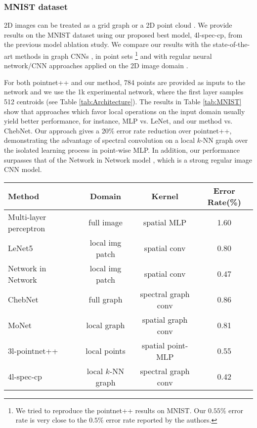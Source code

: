 \documentclass[runningheads]{llncs}
\begin{document}
\subsubsection{MNIST dataset}\label{sec:exp_mnist}
2D images can be treated as a grid graph \cite{defferrard2016convolutional,monti2016geometric} or a 2D point cloud \cite{qi2017pointnet}. We provide results on the MNIST dataset using our proposed best model, 4l-spec-cp, from the previous model ablation study. We compare our results with the state-of-the-art methods in graph CNNs \cite{defferrard2016convolutional,monti2016geometric}, in point sets \cite{qi2017pointnet} \footnote{We tried to reproduce the pointnet++ results on MNIST. Our $0.55 \%$ error rate is very close to the $0.5 \%$ error rate reported by the authors.} and with regular neural network/CNN approaches applied on the 2D image domain \cite{simard2003best,lecun1998gradient,lin2013network}.

For both pointnet++ and our method, 784 points are provided as inputs to the network and we use the 1k experimental network, where the first layer samples 512 centroids (see Table \ref{tab:Architecture}).
The results in Table \ref{tab:MNIST} show that approaches which favor local operations on the input domain usually yield better performance, for instance, MLP vs. LeNet, and our method vs. ChebNet. Our approach gives a 20\% error rate reduction over pointnet++, demonstrating the advantage of spectral convolution on a local $k$-NN graph over the isolated learning process in point-wise MLP. In addition, our performance surpasses that of the Network in Network model \cite{lin2013network}, which is a strong regular image CNN model.


\begin{table*}[h]
	\renewcommand{\arraystretch}{1.2}
	\centering
	\small
	\vspace{-0.5cm}
	\begin{tabular}{@{}l|c|c|c}
		\hline
		Method & Domain & Kernel & Error Rate(\%) \\ \hline
		Multi-layer perceptron \cite{simard2003best} & full image & spatial MLP& 1.60  \\
		LeNet5 \cite{lecun1998gradient} & local img patch & spatial conv & 0.80  \\
		Network in Network \cite{lin2013network} & local img patch & spatial conv & 0.47 \\ \hline
		ChebNet \cite{defferrard2016convolutional} & full graph & spectral graph conv & 0.86 \\
		MoNet \cite{monti2016geometric} & local graph & spatial graph conv & 0.81 \\ \hline
		3l-pointnet++ \cite{qi2017pointnet} & local points & spatial point-MLP &  0.55 \\
		4l-spec-cp & local $k$-NN graph & spectral graph conv & \cellcolor{pink} 0.42  \\ \hline
	\end{tabular}
	\vspace{0.2cm}
	\caption{Results on the MNIST dataset. For the pointnet++ results, we reproduced their experiments, as discussed in \cite{qi2017pointnet}.}
	\label{tab:MNIST}
	\vspace{-1.6cm}
\end{table*}
\end{document}
